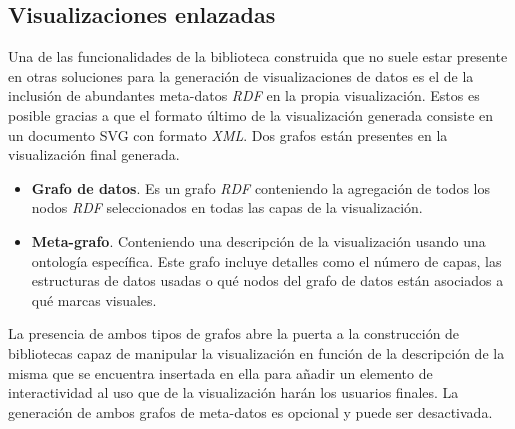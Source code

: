 \subsection{Visualizaciones enlazadas}

Una de las funcionalidades de la biblioteca construida que no suele estar presente en otras soluciones para la generaci\'on de visualizaciones de datos es el de la inclusi\'on de abundantes meta-datos \textit{RDF} en la propia visualizaci\'on. Estos es posible gracias a que el formato \'ultimo de la visualizaci\'on generada consiste en un documento SVG con formato \textit{XML}. Dos grafos est\'an presentes en la visualizaci\'on final generada.

\begin{itemize}
\item \textbf{Grafo de datos}. Es un grafo \textit{RDF} conteniendo la agregaci\'on de todos los nodos \textit{RDF} seleccionados en todas las capas de la visualizaci\'on.
\item \textbf{Meta-grafo}. Conteniendo una descripci\'on de la visualizaci\'on usando una ontolog\'ia espec\'ifica. Este grafo incluye detalles como el n\'umero de capas, las estructuras de datos usadas o qu\'e nodos del grafo de datos est\'an asociados a qu\'e marcas visuales.
\end{itemize}

La presencia de ambos tipos de grafos abre la puerta a la construcci\'on de bibliotecas capaz de manipular la visualizaci\'on en funci\'on de la descripci\'on de la misma que se encuentra insertada en ella para a\~nadir un elemento de interactividad al uso que de la visualizaci\'on har\'an los usuarios finales. La generaci\'on de ambos grafos de meta-datos es opcional y puede ser desactivada.